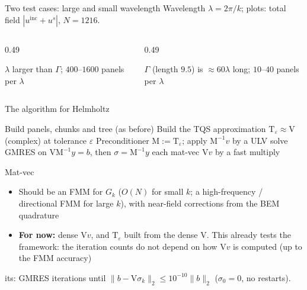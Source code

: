 \documentclass[aspectratio=169,11pt]{beamer}
\begin{document}
\begin{frame}{Two test cases: large and small wavelength}
\small
Wavelength $\lambda=2\pi/k$; plots: total field $|u^{\mathrm{inc}}+u^s|$, $N=1216$.
\begin{columns}[T]
\begin{column}{0.49\textwidth}
\centering
{}

\vspace{-1mm}
\scriptsize $\lambda$ larger than $\Gamma$; $400$--$1600$ panels per $\lambda$
\end{column}
\begin{column}{0.49\textwidth}
\centering
{}

\vspace{-1mm}
\scriptsize $\Gamma$ (length $9.5$) is $\approx60\lambda$ long; $10$--$40$ panels per $\lambda$
\end{column}
\end{columns}
\end{frame}

\begin{frame}{The algorithm for Helmholtz}
\small
\begin{algorithm}[H]
\caption{TQS-preconditioned GMRES for $\mathrm{V}\sigma=b$}
\begin{algorithmic}[1]
\State Build panels, chunks and tree (as before)
\State Build the TQS approximation $\mathrm{T}_\varepsilon\approx\mathrm{V}$ (complex) at tolerance $\varepsilon$
\State Preconditioner $\mathrm{M}:=\mathrm{T}_\varepsilon$; apply $\mathrm{M}^{-1}v$ by a ULV solve
\State GMRES on $\mathrm{V}\mathrm{M}^{-1}y=b$, then $\sigma=\mathrm{M}^{-1}y$
\Statex \hspace{\algorithmicindent}each mat-vec $\mathrm{V}v$ by a fast multiply
\end{algorithmic}
\end{algorithm}
\vspace{-1mm}
\begin{block}{Mat-vec}
\begin{itemize}
\item Should be an FMM for $G_k$ ($O(N)$ for small $k$; a high-frequency / directional FMM for large $k$), with near-field corrections from the BEM quadrature
\item \textbf{For now:} dense $\mathrm{V}v$, and $\mathrm{T}_\varepsilon$ built from the dense $\mathrm{V}$. This already tests the framework: the iteration counts do not depend on how $\mathrm{V}v$ is computed (up to the FMM accuracy)
\end{itemize}
\end{block}
its: GMRES iterations until $\|b-\mathrm{V}\sigma_k\|_2\le10^{-10}\|b\|_2$ ($\sigma_0=0$, no restarts).
\end{frame}
\end{document}
